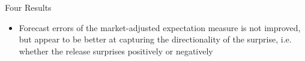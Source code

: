 \documentclass[final]{beamer}
\begin{document}
\begin{frame}
\begin{columns}[t]
\begin{column}{.53 \linewidth}
\begin{columns}[t]
\begin{column}{.48 \linewidth}
\begin{block}{Four Results}
\begin{itemize}
\item Forecast errors of the market-adjusted expectation
measure is not improved, but appear to be better at
capturing the directionality of the surprise, i.e. whether the release
surprises positively or negatively

\end{itemize}

\end{block}%

\end{column}%

\end{columns}%

\end{column}%

\end{columns}%
\end{frame}
\end{document}
